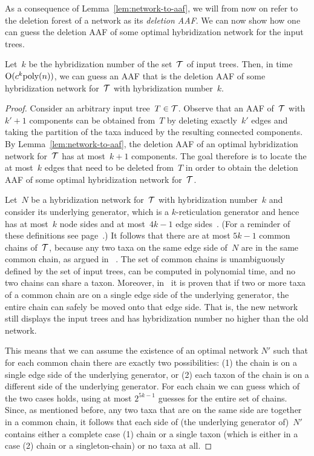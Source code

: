 As a consequence of Lemma~\ref{lem:network-to-aaf}, we will from now on refer to the deletion forest of a network as its \emph{deletion AAF}. {We can now show how one can guess the deletion AAF of some optimal hybridization network for the input trees.}
\begin{lem}
  \label{lem:aaf-to-network}
Let~$k$ be the hybridization number of the {set~$\mathcal{T}$} of input trees. Then, in time
$\mathrm{O}(c^k \text{poly}(n))$, we can guess an AAF {that is the deletion AAF of some hybridization network for~$\mathcal{T}$ with hybridization number~$k$}.
\end{lem}
\begin{proof}
{Consider an arbitrary input tree~$T\in\mathcal{T}$. Observe that an AAF of~$\mathcal{T}$ with $k'+1$ components can be obtained from~$T$ by deleting exactly~$k'$ edges and taking the partition of the taxa induced by the resulting connected components. By Lemma~\ref{lem:network-to-aaf}, the deletion AAF of an optimal hybridization network for~$\mathcal{T}$ has at most~$k+1$ components. The goal therefore is to locate the at most~$k$ edges that need to be deleted from~$T$ in order to obtain the deletion AAF of some optimal hybridization network for~$\mathcal{T}$.}

{Let~$N$ be a hybridization network for~$\mathcal{T}$ with hybridization number~$k$ and consider its underlying generator, which is a $k$-reticulation generator and hence has at most~$k$ node sides and at most~$4k-1$ edge sides~\cite{vanIerselLinz}. (For a reminder of these definitions see page~\pageref{sec:kernel}.) It follows that there are at most $5k-1$ common chains of~$\mathcal{T}$, because any two taxa on the same edge side of~$N$ are in the same common chain, as argued in ~\cite{vanIerselLinz}. The} set of common chains is unambiguously defined by the set of input trees, can be computed in polynomial time, and no two chains can share a taxon. {Moreover,} in~\cite{vanIerselLinz} it is proven that if two or more taxa of a common chain are on a single edge side of the underlying generator, the entire chain can safely be moved onto that edge side. That is, the new network still displays the input trees and has hybridization number no higher than the old network.

This means that we can assume the existence of an optimal network $N'$ such that for each common chain there are exactly two possibilities: (1) the chain is on a single {edge side} of the underlying generator, or (2) each taxon of the chain is on a different side of the underlying generator. For each chain we can guess which of the two cases holds, using at most $2^{5k-1}$ guesses for the entire set of chains. {Since, as mentioned before, any two taxa that are on the same side are together in a common chain, it follows that each side of (the underlying generator of)~$N'$ contains either a complete case (1) chain or a single taxon (which is either in a case (2) chain or a singleton-chain) or no taxa at all.}


\end{proof}
